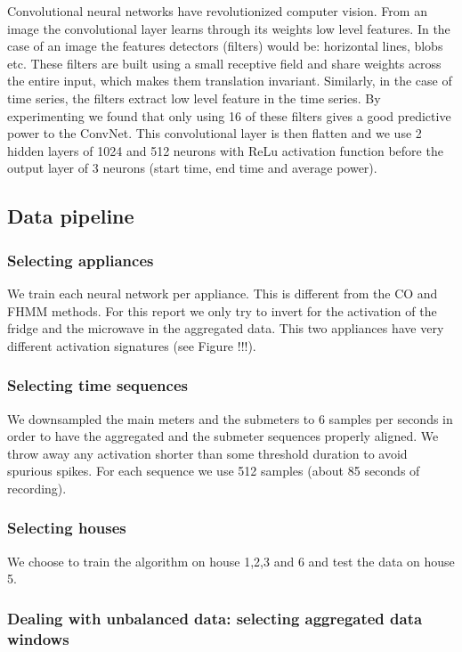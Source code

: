 \documentclass[11pt]{article}
\begin{document}
Convolutional neural networks have revolutionized computer vision. From an image the convolutional layer learns through its weights low level features. In the case of an image the features detectors (filters) would be: horizontal lines, blobs etc. These filters are built using a small receptive field and share weights across the entire input, which makes them translation invariant. Similarly, in the case of time series, the filters extract low level feature in the time series. By experimenting we found that only using 16 of these filters gives a good predictive power to the ConvNet. This convolutional layer is then flatten and we use 2 hidden layers of 1024 and 512 neurons with ReLu activation function before the output layer of 3 neurons (start time, end time and average power).

\subsection{Data pipeline}

\subsubsection{Selecting appliances}

We train each neural network per appliance. This is different from the CO and FHMM methods. For this report we only try to invert for the activation of the fridge and the microwave in the aggregated data. This two appliances have very different activation signatures (see Figure !!!).

\subsubsection{Selecting time sequences}

We downsampled  the main meters and the submeters to 6 samples per seconds in order to have the aggregated and the submeter sequences properly aligned. We throw away any activation shorter than some threshold duration to avoid spurious spikes. For each sequence we use 512 samples (about 85 seconds of recording).

\subsubsection{Selecting houses}

We choose to train the algorithm on house 1,2,3 and 6 and test the data on house 5.

\subsubsection{Dealing with unbalanced data: selecting aggregated data windows}
\end{document}
